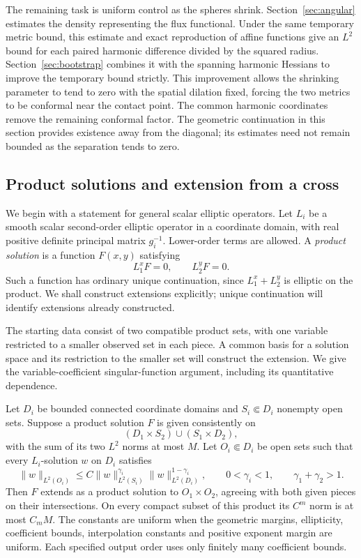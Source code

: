 The remaining task is uniform control as the spheres shrink.
Section~\ref{sec:angular} estimates the density representing the flux
functional. Under the same temporary metric bound, this estimate and exact
reproduction of affine functions give an $L^2$ bound for each paired
harmonic difference divided by the squared radius.
Section~\ref{sec:bootstrap} combines it with the spanning harmonic
Hessians to improve the temporary bound strictly. This improvement
allows the shrinking parameter to tend to zero with the spatial dilation
fixed, forcing the two metrics to be conformal near the contact point.
The common harmonic coordinates remove the remaining conformal factor. The geometric
continuation in this section provides existence away from the diagonal;
its estimates need not remain bounded as the separation tends to zero.

\subsection{Product solutions and extension from a cross}

We begin with a statement for general scalar elliptic operators. Let
$L_i$ be a smooth scalar second-order elliptic operator in a coordinate
domain, with real positive definite principal matrix $g_i^{-1}$.
Lower-order terms are allowed. A \emph{product solution} is a function
$F(x,y)$ satisfying
\[
 L_1^xF=0,\qquad L_2^yF=0.
\]
Such a function has ordinary unique continuation, since $L_1^x+L_2^y$
is elliptic on the product. We shall construct extensions explicitly;
unique continuation will identify extensions already constructed.

The starting data consist of two compatible product sets, with one
variable restricted to a smaller observed set in each piece. A common
basis for a solution space and its restriction to the smaller set will
construct the extension. We give the variable-coefficient singular-function argument,
including its quantitative dependence.

\begin{lemma}\label{cross:series}
Let $D_i$ be bounded connected coordinate domains and
$S_i\Subset D_i$ nonempty open sets.  Suppose a product solution $F$ is
given consistently on
\[
 (D_1\times S_2)\cup(S_1\times D_2),
\]
with the sum of its two $L^2$ norms at most $M$.
Let $O_i\Subset D_i$ be open sets such that every $L_i$-solution $w$
on $D_i$ satisfies
\begin{equation}\label{cross:interpolation-input}
 \|w\|_{L^2(O_i)}
 \le C\|w\|_{L^2(S_i)}^{\gamma_i}
          \|w\|_{L^2(D_i)}^{1-\gamma_i},
 \qquad 0<\gamma_i<1,\qquad \gamma_1+\gamma_2>1.
\end{equation}
Then $F$ extends as a product solution to $O_1\times O_2$, agreeing
with both given pieces on their intersections.  On every compact
subset of this product its $C^m$ norm is at most $C_mM$.
The constants are uniform when the geometric margins, ellipticity,
coefficient bounds, interpolation constants and positive exponent
margin are uniform.  Each specified output order uses only finitely
many coefficient bounds.
\end{lemma}

